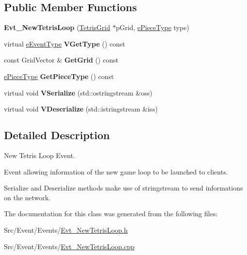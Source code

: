 \subsection*{Public Member Functions}
\begin{DoxyCompactItemize}
\item 
\hypertarget{classEvt__NewTetrisLoop_a35e2c89ec0633a90c0f14555c90e2c7f}{{\bfseries Evt\-\_\-\-New\-Tetris\-Loop} (\hyperlink{classTetrisGrid}{Tetris\-Grid} $\ast$p\-Grid, \hyperlink{TetrisGfxBlock_8h_a2592cbf66d668df0e31fa8d0d8a174de}{e\-Piece\-Type} type)}\label{classEvt__NewTetrisLoop_a35e2c89ec0633a90c0f14555c90e2c7f}

\item 
\hypertarget{classEvt__NewTetrisLoop_a4b28e22be50f655459e7cdd48dd9f06d}{virtual \hyperlink{IEvent_8h_a052e637824ed8cb8a5e9d5d73b5b3c8b}{e\-Event\-Type} {\bfseries V\-Get\-Type} () const }\label{classEvt__NewTetrisLoop_a4b28e22be50f655459e7cdd48dd9f06d}

\item 
\hypertarget{classEvt__NewTetrisLoop_a8c286b78634350ce7f77b6880cbfbc77}{const Grid\-Vector \& {\bfseries Get\-Grid} () const }\label{classEvt__NewTetrisLoop_a8c286b78634350ce7f77b6880cbfbc77}

\item 
\hypertarget{classEvt__NewTetrisLoop_aacf94e8458c3505a9b9b2d32e2bfe970}{\hyperlink{TetrisGfxBlock_8h_a2592cbf66d668df0e31fa8d0d8a174de}{e\-Piece\-Type} {\bfseries Get\-Piece\-Type} () const }\label{classEvt__NewTetrisLoop_aacf94e8458c3505a9b9b2d32e2bfe970}

\item 
\hypertarget{classEvt__NewTetrisLoop_ab29286e0e9e795078c6c8687ab8715ab}{virtual void {\bfseries V\-Serialize} (std\-::ostringstream \&oss)}\label{classEvt__NewTetrisLoop_ab29286e0e9e795078c6c8687ab8715ab}

\item 
\hypertarget{classEvt__NewTetrisLoop_aeedb85189f5510e138d0520ef42bc5dc}{virtual void {\bfseries V\-Deserialize} (std\-::istringstream \&iss)}\label{classEvt__NewTetrisLoop_aeedb85189f5510e138d0520ef42bc5dc}

\end{DoxyCompactItemize}


\subsection{Detailed Description}
New Tetris Loop Event. 

Event allowing information of the new game loop to be launched to clients.

Serialize and Deserialize methods make use of stringstream to send informations on the network. 

The documentation for this class was generated from the following files\-:\begin{DoxyCompactItemize}
\item 
Src/\-Event/\-Events/\hyperlink{Evt__NewTetrisLoop_8h}{Evt\-\_\-\-New\-Tetris\-Loop.\-h}\item 
Src/\-Event/\-Events/\hyperlink{Evt__NewTetrisLoop_8cpp}{Evt\-\_\-\-New\-Tetris\-Loop.\-cpp}\end{DoxyCompactItemize}
